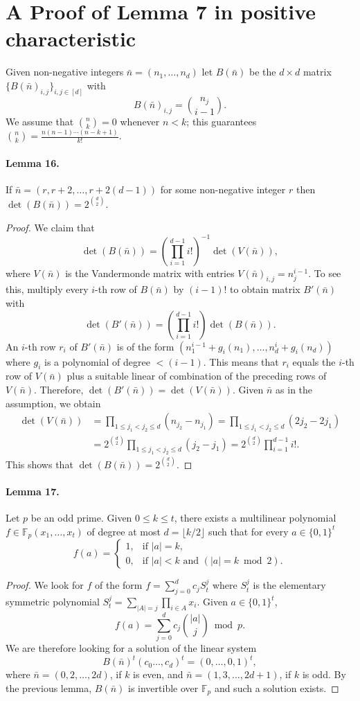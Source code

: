 \section*{A Proof of Lemma 7 in positive characteristic}
Given non-negative integers $\bar n=(n_1,\ldots,n_d)$ let $B(\bar n)$ be the $d\times d$ matrix $\{B(\bar n)_{i,j}\}_{i,j\in[d]}$ with
\[B(\bar n)_{i,j}=\binom{n_j}{i-1}.\]
We assume that $\binom nk=0$ whenever $n<k$; this guarantees $\binom nk=\frac{n(n-1)\cdots(n-k+1)}{k!}$.
\paragraph{Lemma 16.} If $\bar n=(r,r+2,\ldots,r+2(d-1))$ for some non-negative integer $r$ then $\det(B(\bar n))=2^{\binom d2}$.
\begin{proof}
We claim that
\[\det(B(\bar n))=\left(\prod_{i=1}^{d-1}i!\right)^{-1}\det(V(\bar n)),\]
where $V(\bar n)$ is the Vandermonde matrix with entries $V(\bar n)_{i,j}=n_j^{i-1}$. To see this, multiply every $i$-th row of $B(\bar n)$ by $(i-1)!$ to obtain matrix $B'(\bar n)$ with
\[\det(B'(\bar n))=\left(\prod_{i=1}^{d-1}i!\right)\det(B(\bar n)).\]
An $i$-th row $r_i$ of $B'(\bar n)$ is of the form $(n_1^{i-1}+g_i(n_1),\ldots,n_d^i+g_i(n_d))$ where $g_i$ is a polynomial of degree $<(i-1)$. This means that $r_i$ equals the $i$-th row of $V(\bar n)$ plus a suitable linear of combination of the preceding rows of $V(\bar n)$. Therefore, $\det(B'(\bar n))=\det(V(\bar n))$.
Given $\bar n$ as in the assumption, we obtain
\begin{align*}
\det(V(\bar n))&=\prod_{1\le j_1<j_2\le d}(n_{j_2}-n_{j_1})=\prod_{1\le j_1<j_2\le d}(2j_2-2j_1)\\
&=2^{\binom d2}\prod_{1\le j_1<j_2\le d}(j_2-j_1)=2^{\binom d2}\prod_{i=1}^{d-1}i!.
\end{align*}
This shows that $\det(B(\bar n))=2^{\binom d2}$.
\end{proof}
\paragraph{Lemma 17.} Let $p$ be an odd prime. Given $0\le k\le t$, there exists a multilinear polynomial $f\in\mathbb F_p(x_1,\ldots,x_t)$ of degree at most $d=\lfloor k/2\rfloor$ such that for every $a\in\{0,1\}^t$
\[f(a)=\begin{cases}1,&\text{if }|a|=k,\\0,&\text{if }|a|<k\text{ and }(|a|=k\bmod2).\end{cases}\]
\begin{proof}
We look for $f$ of the form $f=\sum_{j=0}^d c_j S_t^j$ where $S_t^j$ is the elementary symmetric polynomial $S_t^j=\sum_{|A|=j}\prod_{i\in A}x_i$. Given $a\in\{0,1\}^t$,
\[f(a)=\sum_{j=0}^d c_j\binom{|a|}j\bmod p.\]
We are therefore looking for a solution of the linear system
\[B(\bar n)^t(c_0\ldots,c_d)^t=(0,\ldots,0,1)^t,\]
where $\bar n=(0,2,\ldots,2d)$, if $k$ is even, and $\bar n=(1,3,\ldots,2d+1)$, if $k$ is odd. By the previous lemma, $B(\bar n)$ is invertible over $\mathbb F_p$ and such a solution exists.
\end{proof}

